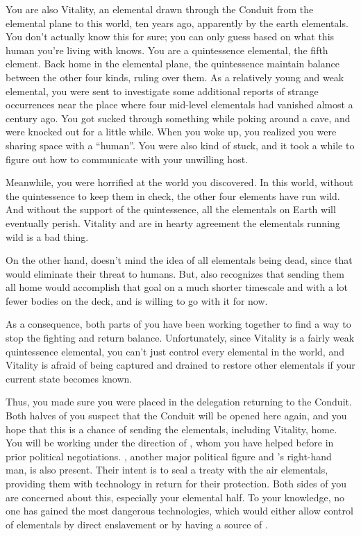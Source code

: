 \documentclass[char]{elementals}
\begin{document}
You are also Vitality, an elemental drawn through the Conduit from the elemental plane to this world, ten years ago, apparently by the earth elementals.  You don't actually know this for sure; you can only guess based on what this human you're living with knows.  You are a quintessence elemental, the fifth element.  Back home in the elemental plane, the quintessence maintain balance between the other four kinds, ruling over them.  As a relatively young and weak elemental, you were sent to investigate some additional reports of strange occurrences near the place where four mid-level elementals had vanished almost a century ago.  You got sucked through something while poking around a cave, and were knocked out for a little while.  When you woke up, you realized you were sharing space with a ``human''.  You were also kind of stuck, and it took a while to figure out how to communicate with your unwilling host.

Meanwhile, you were horrified at the world you discovered.  In this world, without the quintessence to keep them in check, the other four elements have run wild.  And without the support of the quintessence, all the elementals on Earth will eventually perish.  Vitality and \cAvatar{} are in hearty agreement the elementals running wild is a bad thing.

On the other hand, \cAvatar{} doesn't mind the idea of all elementals being dead, since that would eliminate their threat to humans.  But, \cAvatar{} also recognizes that sending them all home would accomplish that goal on a much shorter timescale and with a lot fewer bodies on the deck, and is willing to go with it for now.

As a consequence, both parts of you have been working together to find a way to stop the fighting and return balance.  Unfortunately, since Vitality is a fairly weak quintessence elemental, you can't just control every elemental in the world, and Vitality is afraid of being captured and drained to restore other elementals if your current state becomes known.

Thus, you made sure you were placed in the delegation returning to the Conduit.  Both halves of you suspect that the Conduit will be opened here again, and you hope that this is a chance of sending the elementals, including Vitality, home.  You will be working under the direction of \cLeader{}, whom you have helped before in prior political negotiations.  \cDema{}, another major political figure and \cLeader{}'s right-hand man, is also present.  Their intent is to seal a treaty with the air elementals, providing them with technology in return for their protection.  Both sides of you are concerned about this, especially your elemental half.  To your knowledge, no one has gained the most dangerous technologies, which would either allow control of elementals by direct enslavement or by having a source of \iWhite{}.
\end{document}
